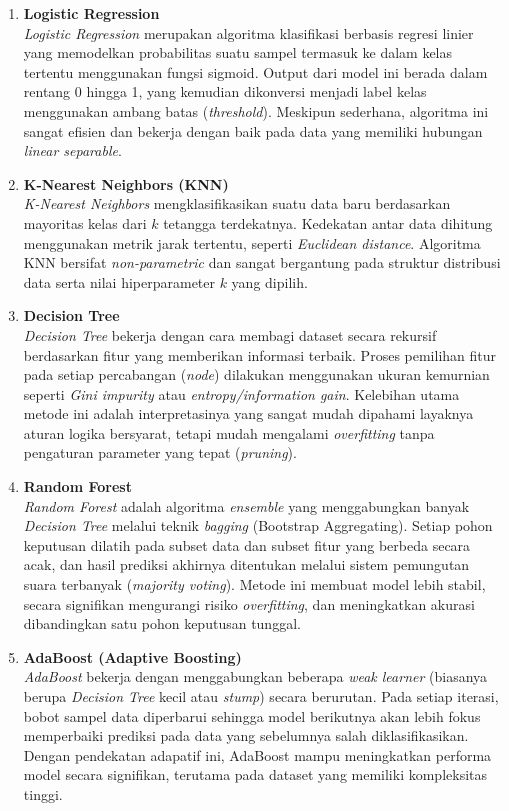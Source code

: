 \begin{enumerate}
    \item \textbf{Logistic Regression}\\
    \textit{Logistic Regression} merupakan algoritma klasifikasi berbasis regresi linier yang memodelkan probabilitas suatu sampel termasuk ke dalam kelas tertentu menggunakan fungsi sigmoid. Output dari model ini berada dalam rentang 0 hingga 1, yang kemudian dikonversi menjadi label kelas menggunakan ambang batas (\textit{threshold}). Meskipun sederhana, algoritma ini sangat efisien dan bekerja dengan baik pada data yang memiliki hubungan \textit{linear separable}.

    \item \textbf{K-Nearest Neighbors (KNN)}\\
    \textit{K-Nearest Neighbors} mengklasifikasikan suatu data baru berdasarkan mayoritas kelas dari $k$ tetangga terdekatnya. Kedekatan antar data dihitung menggunakan metrik jarak tertentu, seperti \textit{Euclidean distance}. Algoritma KNN bersifat \textit{non-parametric} dan sangat bergantung pada struktur distribusi data serta nilai hiperparameter $k$ yang dipilih.

    \item \textbf{Decision Tree}\\
    \textit{Decision Tree} bekerja dengan cara membagi dataset secara rekursif berdasarkan fitur yang memberikan informasi terbaik. Proses pemilihan fitur pada setiap percabangan (\textit{node}) dilakukan menggunakan ukuran kemurnian seperti \textit{Gini impurity} atau \textit{entropy/information gain}. Kelebihan utama metode ini adalah interpretasinya yang sangat mudah dipahami layaknya aturan logika bersyarat, tetapi mudah mengalami \textit{overfitting} tanpa pengaturan parameter yang tepat (\textit{pruning}).

    \item \textbf{Random Forest}\\
    \textit{Random Forest} adalah algoritma \textit{ensemble} yang menggabungkan banyak \textit{Decision Tree} melalui teknik \textit{bagging} (Bootstrap Aggregating). Setiap pohon keputusan dilatih pada subset data dan subset fitur yang berbeda secara acak, dan hasil prediksi akhirnya ditentukan melalui sistem pemungutan suara terbanyak (\textit{majority voting}). Metode ini membuat model lebih stabil, secara signifikan mengurangi risiko \textit{overfitting}, dan meningkatkan akurasi dibandingkan satu pohon keputusan tunggal.

    \item \textbf{AdaBoost (Adaptive Boosting)}\\
    \textit{AdaBoost} bekerja dengan menggabungkan beberapa \textit{weak learner} (biasanya berupa \textit{Decision Tree} kecil atau \textit{stump}) secara berurutan. Pada setiap iterasi, bobot sampel data diperbarui sehingga model berikutnya akan lebih fokus memperbaiki prediksi pada data yang sebelumnya salah diklasifikasikan. Dengan pendekatan adapatif ini, AdaBoost mampu meningkatkan performa model secara signifikan, terutama pada dataset yang memiliki kompleksitas tinggi.
\end{enumerate}

